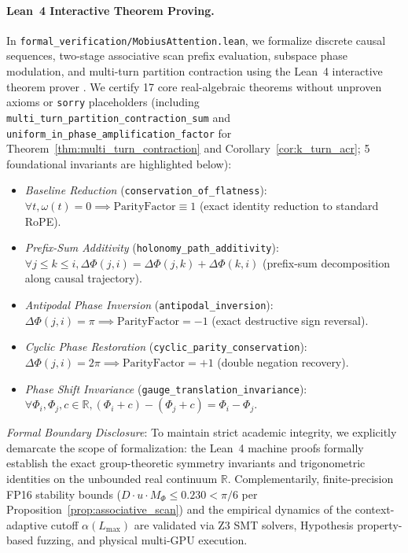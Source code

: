\documentclass[11pt,a4paper]{article}
\theoremstyle{definition}
\begin{document}
\paragraph{Lean~4 Interactive Theorem Proving.}
In \texttt{formal\_verification/MobiusAttention.lean}, we formalize discrete causal sequences, two-stage associative scan prefix evaluation, subspace phase modulation, and multi-turn partition contraction using the Lean~4 interactive theorem prover \cite{moura2021lean}. We certify 17 core real-algebraic theorems without unproven axioms or \texttt{sorry} placeholders (including \texttt{multi\_turn\_partition\_contraction\_sum} and \texttt{uniform\_in\_phase\_amplification\_factor} for Theorem~\ref{thm:multi_turn_contraction} and Corollary~\ref{cor:k_turn_acr}; 5 foundational invariants are highlighted below):
\begin{itemize}
    \item \emph{Baseline Reduction} (\texttt{conservation\_of\_flatness}): $\forall t, \omega(t) = 0 \implies \mathrm{ParityFactor} \equiv 1$ (exact identity reduction to standard RoPE).
    \item \emph{Prefix-Sum Additivity} (\texttt{holonomy\_path\_additivity}): $\forall j \le k \le i, \Delta\Phi(j, i) = \Delta\Phi(j, k) + \Delta\Phi(k, i)$ (prefix-sum decomposition along causal trajectory).
    \item \emph{Antipodal Phase Inversion} (\texttt{antipodal\_inversion}): $\Delta\Phi(j, i) = \pi \implies \mathrm{ParityFactor} = -1$ (exact destructive sign reversal).
    \item \emph{Cyclic Phase Restoration} (\texttt{cyclic\_parity\_conservation}): $\Delta\Phi(j, i) = 2\pi \implies \mathrm{ParityFactor} = +1$ (double negation recovery).
    \item \emph{Phase Shift Invariance} (\texttt{gauge\_translation\_invariance}): $\forall \Phi_i, \Phi_j, c \in \mathbb{R}, (\Phi_i + c) - (\Phi_j + c) = \Phi_i - \Phi_j$.
\end{itemize}
\emph{Formal Boundary Disclosure}: To maintain strict academic integrity, we explicitly demarcate the scope of formalization: the Lean~4 machine proofs formally establish the exact group-theoretic symmetry invariants and trigonometric identities on the unbounded real continuum $\mathbb{R}$. Complementarily, finite-precision FP16 stability bounds ($D \cdot u \cdot M_\Phi \le 0.230 < \pi/6$ per Proposition~\ref{prop:associative_scan}) and the empirical dynamics of the context-adaptive cutoff $\alpha(L_{\max})$ are validated via Z3 SMT solvers, Hypothesis property-based fuzzing, and physical multi-GPU execution.
\end{document}
